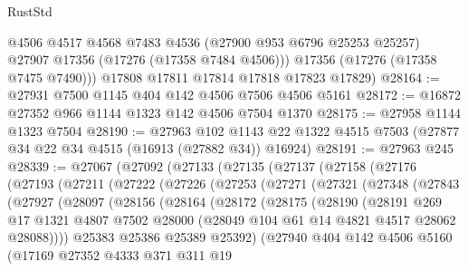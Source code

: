 \begin{lexlean}{RustStd}
\begin{coremodule}
          @4506
          @4517
          @4568
          @7483
          @4536
          (@27900 @953 @6796 @25253 @25257)
          @27907
          @17356
          (@17276 (@17358 @7484 @4506)))
        @17356
        (@17276 (@17358 @7475 @7490)))
      @17808
      @17811
      @17814
      @17818
      @17823
      @17829)
@28164 := @27931 @7500 @1145 @404 @142 @4506 @7506 @4506 @5161
@28172 := @16872 @27352 @966 @1144 @1323 @142 @4506 @7504 @1370
@28175 := @27958 @1144 @1323 @7504
@28190 := @27963
    @102
    @1143
    @22
    @1322
    @4515
    @7503
    (@27877 @34 @22 @34 @4515 (@16913 (@27882 @34)) @16924)
@28191 := @27963 @245
@28339 := @27067
    (@27092
      (@27133
        (@27135
          (@27137
            (@27158
              (@27176
                (@27193
                  (@27211
                    (@27222
                      (@27226
                        (@27253
                          (@27271
                            (@27321
                              (@27348
                                (@27843
                                  (@27927
                                    (@28097
                                      (@28156
                                        (@28164
                                          (@28172
                                            (@28175
                                              (@28190
                                                (@28191
                                                  @269
                                                  @17
                                                  @1321
                                                  @4807
                                                  @7502
                                                  @28000
                                                  (@28049 @104 @61 @14 @4821 @4517 @28062 @28088))))
                                            @25383
                                            @25386
                                            @25389
                                            @25392)
                                          (@27940
                                            @404
                                            @142
                                            @4506
                                            @5160
                                            (@17169
                                              @27352
                                              @4333
                                              @371
                                              @311
                                              @19

\end{coremodule}
\end{lexlean}
